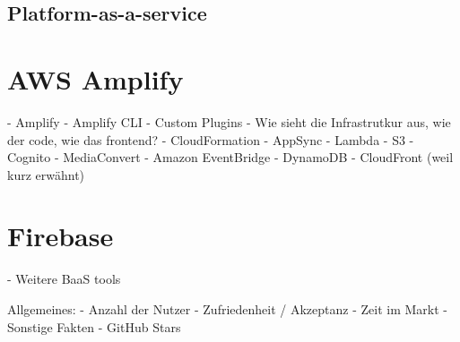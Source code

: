   \subsection{Platform-as-a-service}

\section{AWS Amplify}

\autocite{dahunsi2021commercial}
\autocite{amplifyDocs}
\autocite{lysakov2021security}
\autocite{mathew2014overview}
\autocite{beach2014aws}

  - Amplify
  - Amplify CLI
  - Custom Plugins
  - Wie sieht die Infrastrutkur aus, wie der code, wie das frontend?
  - CloudFormation
  - AppSync
  - Lambda
  - S3
  - Cognito
  - MediaConvert
  - Amazon EventBridge
  - DynamoDB
  - CloudFront (weil kurz erwähnt)

\section{Firebase}

\autocite{moroney2017definitive}
\autocite{firebaseDocs}
\autocite{tanna2018serverless}

- Weitere BaaS tools

Allgemeines:
  - Anzahl der Nutzer
  - Zufriedenheit / Akzeptanz
  - Zeit im Markt
  - Sonstige Fakten
  - GitHub Stars